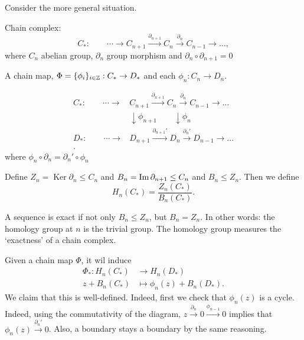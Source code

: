 
Consider the more general situation.
\begin{definition}
    Chain complex:
    \[
    C_*: \qquad \cdots \to  C_{n+1} \xrightarrow{\partial _{n+1}}   C_n \xrightarrow{\partial _n}   C_{n-1} \to  \ldots
    ,\] 
    where $C_n$ abelian group, $\partial_n$ group morphism and $\partial _n  \circ  \partial _{n+1} = 0$
\end{definition}

\begin{definition}
    A chain map, $\Phi = \{ \phi_i\}_{i \in \mathbb{Z}}: C_* \to  D_*$ and each $\phi_n: C_n \to  D_n$.

    \begin{align*}
        C_*: \qquad \cdots \to  &C_{n+1} \xrightarrow{\partial _{n+1}}   C_n \xrightarrow{\partial _n}   C_{n-1} \to  \ldots\\
        &\downarrow \phi_{n+1} \qquad \downarrow \phi_{n}\\
        D_*: \qquad \cdots \to  &D_{n+1} \xrightarrow{\partial_{n+1}'}   D_n \xrightarrow{\partial _n'}   D_{n-1} \to  \ldots\\
    .\end{align*}
    where $\phi_n  \circ  \partial_n = \partial_n'  \circ  \phi_n$

    Define $Z_n = \operatorname{Ker} \partial_n \le  C_n$ and $B_n = \operatorname{Im} \partial_{n+1} \le  C_n$ and $B_n \le  Z_n$.
    Then we define
    \[
        H_n(C_*) = \frac{Z_n(C_*)}{B_n(C_*)}
    .\] 
\end{definition}
\begin{definition}
    A sequence is exact if not only $B_n \le  Z_n$, but $B_n = Z_n$.
    In other words: the homology group at $n$ is  the trivial group.
    The homology group measures the `exactness' of a chain complex.
\end{definition}

Given a chain map $\Phi$, it wil induce
\begin{align*}
    \Phi_*: H_n(C_*) &\longrightarrow H_n(D_*) \\
    z + B_n(C_*) &\longmapsto \phi_n(z) + B_n(D_*)
.\end{align*}
We claim that this is well-defined.
Indeed, first we check that $\phi_n(z)$ is a cycle. Indeed, using the commutativity of the diagram, $z \xrightarrow{\partial_n}  0 \xrightarrow{\phi_{n-1}} 0$ implies that $\phi_n(z) \xrightarrow{\partial_n'} 0$.
Also, a boundary stays a boundary by the same reasoning.

